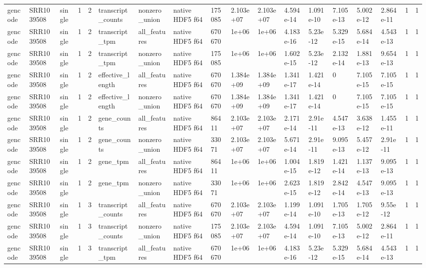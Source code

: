 \begin{tabular}{llllllllllllllllll}
gencode & SRR1039508 & single & 1 & 2 & transcript\_counts & nonzero\_union & native HDF5 f64 & 175085 & 2.103e+07 & 2.103e+07 & 4.594e-14 & 1.091e-10 & 7.105e-13 & 5.002e-12 & 2.864e-11 & 1 & 1 \\
gencode & SRR1039508 & single & 1 & 2 & transcript\_tpm & all\_features & native HDF5 f64 & 670670 & 1e+06 & 1e+06 & 4.183e-16 & 5.23e-12 & 5.329e-15 & 5.684e-14 & 4.543e-13 & 1 & 1 \\
gencode & SRR1039508 & single & 1 & 2 & transcript\_tpm & nonzero\_union & native HDF5 f64 & 175085 & 1e+06 & 1e+06 & 1.602e-15 & 5.23e-12 & 2.132e-14 & 1.881e-13 & 9.654e-13 & 1 & 1 \\
gencode & SRR1039508 & single & 1 & 2 & effective\_length & all\_features & native HDF5 f64 & 670670 & 1.384e+09 & 1.384e+09 & 1.341e-17 & 1.421e-14 & 0 & 7.105e-15 & 7.105e-15 & 1 & 1 \\
gencode & SRR1039508 & single & 1 & 2 & effective\_length & nonzero\_union & native HDF5 f64 & 670670 & 1.384e+09 & 1.384e+09 & 1.341e-17 & 1.421e-14 & 0 & 7.105e-15 & 7.105e-15 & 1 & 1 \\
gencode & SRR1039508 & single & 1 & 2 & gene\_counts & all\_features & native HDF5 f64 & 86411 & 2.103e+07 & 2.103e+07 & 2.171e-14 & 2.91e-11 & 4.547e-13 & 3.638e-12 & 1.455e-11 & 1 & 1 \\
gencode & SRR1039508 & single & 1 & 2 & gene\_counts & nonzero\_union & native HDF5 f64 & 33071 & 2.103e+07 & 2.103e+07 & 5.671e-14 & 2.91e-11 & 9.095e-13 & 5.457e-12 & 2.91e-11 & 1 & 1 \\
gencode & SRR1039508 & single & 1 & 2 & gene\_tpm & all\_features & native HDF5 f64 & 86411 & 1e+06 & 1e+06 & 1.004e-15 & 1.819e-12 & 1.421e-14 & 1.137e-13 & 9.095e-13 & 1 & 1 \\
gencode & SRR1039508 & single & 1 & 2 & gene\_tpm & nonzero\_union & native HDF5 f64 & 33071 & 1e+06 & 1e+06 & 2.623e-15 & 1.819e-12 & 2.842e-14 & 4.547e-13 & 9.095e-13 & 1 & 1 \\
gencode & SRR1039508 & single & 1 & 3 & transcript\_counts & all\_features & native HDF5 f64 & 670670 & 2.103e+07 & 2.103e+07 & 1.199e-14 & 1.091e-10 & 1.705e-13 & 1.705e-12 & 9.55e-12 & 1 & 1 \\
gencode & SRR1039508 & single & 1 & 3 & transcript\_counts & nonzero\_union & native HDF5 f64 & 175085 & 2.103e+07 & 2.103e+07 & 4.594e-14 & 1.091e-10 & 7.105e-13 & 5.002e-12 & 2.864e-11 & 1 & 1 \\
gencode & SRR1039508 & single & 1 & 3 & transcript\_tpm & all\_features & native HDF5 f64 & 670670 & 1e+06 & 1e+06 & 4.183e-16 & 5.23e-12 & 5.329e-15 & 5.684e-14 & 4.543e-13 & 1 & 1 \\

\end{tabular}
